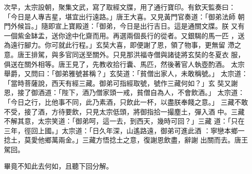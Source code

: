 \begin{pinyinscope}
{次早，太宗設朝，聚集文武，寫了取經文牒，用了通行寶印。有欽天監奏曰：
「今日是人專吉星，堪宜出行遠路。」唐王大喜。又見黃門官奏道：「御弟法師
朝門外候旨。」隨即宣上寶殿道：「御弟，今日是出行吉日。這是通關文牒。朕
又有一個紫金缽盂，送你途中化齋而用。再選兩個長行的從者。又銀騔的馬一匹
，送為遠行腳力。你可就此行程。」玄奘大喜，即便謝了恩，領了物事，更無留
滯之意。唐王排駕，與多官同送至關外。只見那洪福寺僧與諸徒將玄奘的冬夏衣
服，俱送在關外相等。唐王見了，先教收拾行囊、馬匹，然後著官人執壺酌酒。
太宗舉爵，又問曰：「御弟雅號甚稱？」玄奘道：「貧僧出家人，未敢稱號。」
太宗道：「當時菩薩說，西天有經三藏。御弟可指經取號，號作三藏何如？」玄
奘又謝恩，接了御酒道：「陛下，酒乃僧家頭一戒，貧僧自為人，不會飲酒。」
太宗道：「今日之行，比他事不同，此乃素酒，只飲此一杯，以盡朕奉餞之意。」
三藏不敢不受，接了酒，方待要飲，只見太宗低頭，將御指拾一撮塵土，彈入酒
中。三藏不解其意，太宗笑道：「御弟呵，這一去，到西天，幾時可回？」三藏
道：「只在三年，徑回上國。」太宗道：「日久年深，山遙路遠，御弟可進此酒
：寧戀本鄉一捻土，莫愛他鄉萬兩金。」三藏方悟捻土之意，復謝恩飲盡，辭謝
出關而去。唐王駕回。

    畢竟不知此去何如，且聽下回分解。





}
\end{pinyinscope}

